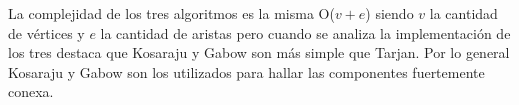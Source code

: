 La complejidad de los tres algoritmos es la misma O($v+e$) siendo $v$ la cantidad de vértices y $e$ la cantidad de aristas pero cuando se analiza la implementación de los tres destaca que Kosaraju y Gabow son más simple que Tarjan. Por lo general Kosaraju y Gabow son los utilizados para hallar las componentes fuertemente conexa.